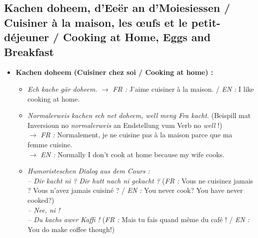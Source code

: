 \subsection{Kachen doheem, d'Eeër an d'Moiesiessen / Cuisiner à la maison, les œufs et le petit-déjeuner / Cooking at Home, Eggs and Breakfast}

\begin{itemize}
    \item \textbf{Kachen doheem (Cuisiner chez soi / Cooking at home) :}
    \begin{itemize}
        \item \textit{Ech kache gär doheem.} $\rightarrow$ \textit{FR :} J'aime cuisiner à la maison. / \textit{EN :} I like cooking at home.
        \item \textit{Normalerweis kachen ech net doheem, well meng Fra kacht.} (Beispill mat Inversioun no \textit{normalerweis} an Endstellung vum Verb no \textit{well} !) \\
        $\rightarrow$ \textit{FR :} Normalement, je ne cuisine pas à la maison parce que ma femme cuisine. \\
        $\rightarrow$ \textit{EN :} Normally I don't cook at home because my wife cooks.
        \item \textit{Humoristeschen Dialog aus dem Cours :} \\
        \textit{-- Dir kacht ni ? Dir hutt nach ni gekacht ?} (\textit{FR :} Vous ne cuisinez jamais ? Vous n'avez jamais cuisiné ? / \textit{EN :} You never cook? You have never cooked?) \\
        \textit{-- Nee, ni !} \\
        \textit{-- Du kachs awer Kaffi !} (\textit{FR :} Mais tu fais quand même du café ! / \textit{EN :} You do make coffee though!)
    \end{itemize}

    \vspace{0.4em}


\end{itemize}
